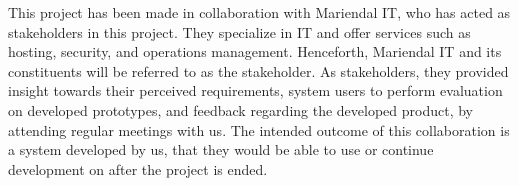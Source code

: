This project has been made in collaboration with Mariendal IT, who has acted as stakeholders in this project.
They specialize in IT and offer services such as hosting, security, and operations management\cite{Mariendal_OmOs}.
Henceforth, Mariendal IT and its constituents  will be referred to as the stakeholder. 
As stakeholders, they provided insight towards their perceived requirements, system users to perform evaluation on developed prototypes, and feedback regarding the developed product, by attending regular meetings with us.
The intended outcome of this collaboration is a system developed by us, that they would be able to use or continue development on after the project is ended.




